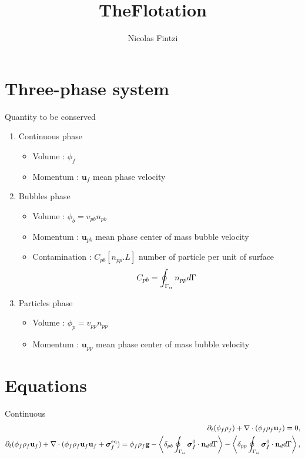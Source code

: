 \documentclass[12pt]{My_preprint}
\title{
    TheFlotation 
    }
\author[1,2]{Nicolas Fintzi}
\begin{document}
\maketitle

\begin{abstract}
\end{abstract}

\section{Three-phase system}
Quantity to be conserved
\begin{enumerate}
    \item Continuous phase
    \begin{itemize}
        \item Volume : $\phi_f $
        \item Momentum : $\textbf{u}_f$ mean phase velocity
    \end{itemize}
    \item Bubbles phase
    \begin{itemize}
        \item Volume : $\phi_b = v_{pb} n_{pb}$
        \item Momentum : $\textbf{u}_{pb}$ mean phase center of mass bubble velocity
        \item Contamination : $C_{pb} [n_{pp}.L]$ number of particle per unit of surface 
        \begin{equation*}
            C_{pb} = \oint_{\Gamma_{\alpha}} n_{pp} d\Gamma
        \end{equation*}
    \end{itemize}
    \item Particles phase
    \begin{itemize}
        \item Volume : $\phi_p = v_{pp} n_{pp}$
        \item Momentum : $\textbf{u}_{pp}$ mean phase center of mass bubble velocity
    \end{itemize}
\end{enumerate}

\section{Equations}
\clearpage
Continuous 
\begin{align*}
    \partial_t (\phi_f \rho_f)  
    + \mathbf{\nabla}\cdot (
        \phi_f \rho_f\textbf{u}_f
    )
    = 
    0,\\
    \partial_t (\phi_f \rho_f\textbf{u}_f)  
    + \mathbf{\nabla}\cdot (
        \phi_f \rho_f\textbf{u}_f\textbf{u}_f
        + \bm{\sigma}_f^\text{eq}
    )
    = 
    \phi_f \rho_f \textbf{g} 
    - \left<\delta_{pb} \oint_{\Gamma_{\alpha}} \bm{\sigma}_f^0 \cdot \textbf{n}_d d\Gamma\right>
    - \left<\delta_{pp} \oint_{\Gamma_{\alpha}} \bm{\sigma}_f^0 \cdot \textbf{n}_d d\Gamma\right>,
    \\
\end{align*}
\end{document}
